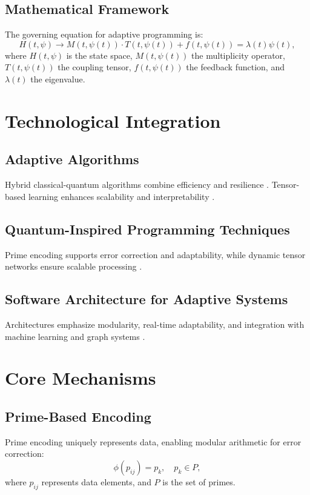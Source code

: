 \documentclass{article}
\theoremstyle{plain}
\begin{document}
\subsection{Mathematical Framework}
The governing equation for adaptive programming is:
\begin{equation}
H(t, \psi) \to M(t, \psi(t)) \cdot T(t, \psi(t)) + f(t, \psi(t)) = \lambda(t) \psi(t),
\end{equation}
where $H(t, \psi)$ is the state space, $M(t, \psi(t))$ the multiplicity operator, $T(t, \psi(t))$ the coupling tensor, $f(t, \psi(t))$ the feedback function, and $\lambda(t)$ the eigenvalue.

\section{Technological Integration}
\subsection{Adaptive Algorithms}
Hybrid classical-quantum algorithms combine efficiency and resilience \cite{farhi2014quantum}. Tensor-based learning enhances scalability and interpretability \cite{orus2021tensor}.

\subsection{Quantum-Inspired Programming Techniques}
Prime encoding supports error correction and adaptability, while dynamic tensor networks ensure scalable processing \cite{nielsen2010quantum}.

\subsection{Software Architecture for Adaptive Systems}
Architectures emphasize modularity, real-time adaptability, and integration with machine learning and graph systems \cite{maheshwari2020prime}.

\section{Core Mechanisms}
\subsection{Prime-Based Encoding}
Prime encoding uniquely represents data, enabling modular arithmetic for error correction:
\begin{equation}
\phi(p_{ij}) = p_k, \quad p_k \in P,
\end{equation}
where $p_{ij}$ represents data elements, and $P$ is the set of primes.
\end{document}
